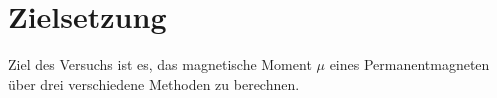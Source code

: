 
\section{Zielsetzung}
\label{sec:Zielsetzung}

Ziel des Versuchs ist es, das magnetische Moment $\mu$ eines
Permanentmagneten über drei verschiedene Methoden zu berechnen.